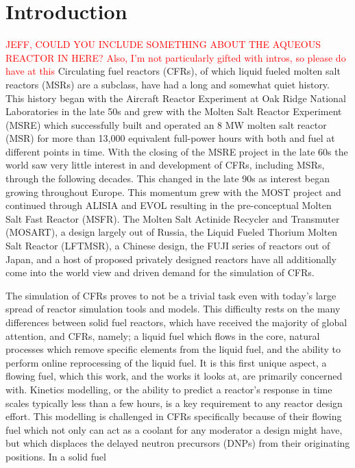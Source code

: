\documentclass[review]{elsarticle}
\begin{document}
\section{Introduction} \label{sec:intro}
\textcolor{red}{JEFF, COULD YOU INCLUDE SOMETHING ABOUT THE AQUEOUS REACTOR IN HERE? Also, I'm not particularly gifted with intros, so please do have at this}
Circulating fuel reactors (CFRs), of which liquid fueled molten salt reactors
 (MSRs) are a subclass, have had a long and somewhat quiet history.
This history began with the Aircraft Reactor Experiment at Oak Ridge National
Laboratories in the late 50s and grew with the Molten Salt Reactor Experiment
(MSRE) which successfully built and operated an 8 MW molten salt reactor (MSR) for 
more than 13,000 equivalent full-power hours with both  and  fuel at different
points in time. With the closing of the MSRE project in the late 60s the world
saw very little interest in and development of CFRs, including MSRs, 
through the following decades. This changed in
the late 90s as interest began growing throughout Europe. This momentum
grew with the MOST project and continued through ALISIA and EVOL resulting in
the pre-conceptual Molten Salt Fast Reactor (MSFR). The Molten Salt Actinide
Recycler and Transmuter (MOSART), a design largely out of Russia, the
Liquid Fueled Thorium Molten Salt Reactor (LFTMSR), a Chinese design, the
FUJI series of reactors out of Japan, and a host of proposed privately designed
reactors have all additionally come into the world view and driven demand for
the simulation of CFRs. 
\par The simulation of CFRs proves to not be a trivial task even with today's
large spread of reactor simulation tools and models. This difficulty rests on
the many differences between solid fuel reactors, which have received the
majority of global attention, and CFRs, namely; a liquid fuel which flows in
the core, natural processes which remove specific elements from the liquid fuel,
and the ability to perform online reprocessing of the liquid fuel. It is this
first unique aspect, a flowing fuel, which this work, and the works it looks at,
are primarily concerned with. Kinetics modelling, or the ability to predict
a reactor's response in time scales typically less than a few hours, is a key
requirement to any reactor design effort. This modelling is challenged in CFRs
specifically because of their flowing fuel which not only can act as a coolant
for any moderator a design might have, but which displaces the delayed
neutron precursors (DNPs) from their originating positions. In a solid fuel
\end{document}
